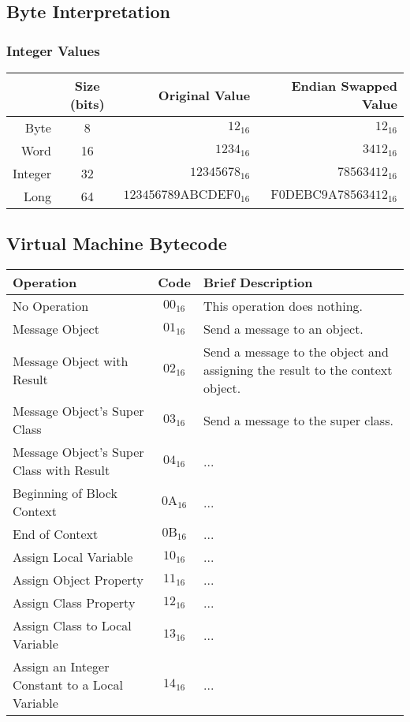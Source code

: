 \subsection {Byte Interpretation}

\subsubsection{Integer Values}

\begin{center}
  \begin{tabular}{ r | c r r }
    & Size (bits) & Original Value & Endian Swapped Value\\ \hline
    Byte & 8 & $12_{16}$ & $12_{16}$ \\
    Word & 16 & $1234_{16}$ & $3412_{16}$ \\
    Integer & 32 & $12345678_{16}$ & $78563412_{16}$ \\
    Long & 64 & $\mathrm{123456789ABCDEF0}_{16}$ &
      $\mathrm{F0DEBC9A78563412}_{16}$\\
  \end{tabular}
\end{center}

\subsection{Virtual Machine Bytecode}

\begin{center}
  \begin{tabular}{ | p{6cm} | c | p{8cm} | }
    \hline
    Operation & Code & Brief Description \\ \hline
    No Operation & $00_{16}$ & This operation does nothing. \\
    Message Object & $01_{16}$ & Send a message to an object. \\
    Message Object with Result & $02_{16}$ & Send a message to the object
    and assigning the result to the context object. \\
    Message Object's Super Class & $03_{16}$ & Send a message to the super
    class.\\
    Message Object's Super Class with Result & $04_{16}$ & ... \\
    Beginning of Block Context & $\mathrm{0A}_{16}$ & ... \\
    End of Context & $\mathrm{0B}_{16}$ & ... \\
    Assign Local Variable & $10_{16}$ & ...\\
    Assign Object Property & $11_{16}$ & ...\\
    Assign Class Property & $12_{16}$ & ...\\
    Assign Class to Local Variable & $13_{16}$ & ...\\
    Assign an Integer Constant to a Local Variable & $14_{16}$ & ...\\
    \hline
  \end{tabular}
\end{center}

